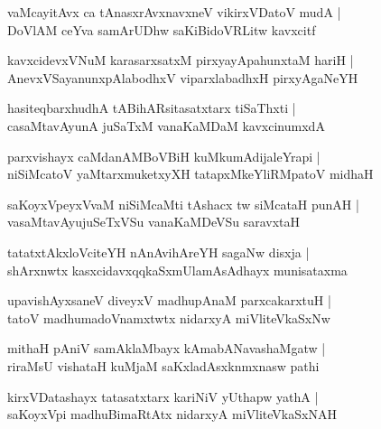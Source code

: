 \documentclass[twoside,12pt,openright]{book}
\newcounter{shloka}[chapter]
\begin{document}
\begin{shloka}%
vaMcayitAvx ca tAnasxrAvxnavxneV vikirxVDatoV mudA |\\
DoVlAM ceYva samArUDhw saKiBidoVRLitw kavxcitf 
\end{shloka}

\begin{shloka}%
kavxcidevxVNuM karasarxsatxM pirxyayApahunxtaM hariH |\\
AnevxVSayanunxpAlabodhxV viparxlabadhxH pirxyAgaNeYH 
\end{shloka}

\begin{shloka}%
hasiteqbarxhudhA tABihARsitasatxtarx tiSaThxti |\\
casaMtavAyunA juSaTxM vanaKaMDaM kavxcinumxdA 
\end{shloka}

\begin{shloka}%
parxvishayx caMdanAMBoVBiH kuMkumAdijaleYrapi |\\
niSiMcatoV yaMtarxmuketxyXH tatapxMkeYliRMpatoV midhaH
\end{shloka}

\begin{shloka}%
saKoyxVpeyxVvaM niSiMcaMti tAshacx tw siMcataH punAH |\\
vasaMtavAyujuSeTxVSu vanaKaMDeVSu saravxtaH 
\end{shloka}

\begin{shloka}%
tatatxtAkxloVciteYH nAnAvihAreYH sagaNw disxja |\\
shArxnwtx kasxcidavxqqkaSxmUlamAsAdhayx munisataxma
\end{shloka}

\begin{shloka}%
upavishAyxsaneV diveyxV madhupAnaM parxcakarxtuH |\\
tatoV madhumadoVnamxtwtx nidarxyA miVliteVkaSxNw
\end{shloka}

\begin{shloka}%
mithaH pAniV samAklaMbayx kAmabANavashaMgatw |\\
riraMsU vishataH kuMjaM saKxladAsxknmxnasw pathi
\end{shloka}

\begin{shloka}%
kirxVDatashayx tatasatxtarx kariNiV yUthapw yathA |\\
saKoyxVpi madhuBimaRtAtx nidarxyA miVliteVkaSxNAH 
\end{shloka}
\end{document}
